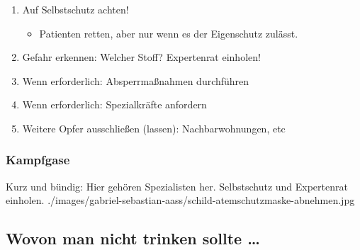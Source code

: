 {{\begin{enumerate}
  \item Auf Selbstschutz achten!
  \begin{itemize}
    \item Patienten retten, aber nur wenn es der
    Eigenschutz zulässt.
  \end{itemize}
  \item Gefahr erkennen: Welcher Stoff? Expertenrat einholen!
  \item Wenn erforderlich: Absperrmaßnahmen durchführen
  \item Wenn erforderlich:  Spezialkräfte anfordern
  \item Weitere Opfer ausschließen (lassen):
  Nachbarwohnungen, etc
\end{enumerate}
}




\subsubsection{Kampfgase}

{%
Kurz und bündig: Hier gehören Spezialisten her.
Selbstschutz und Expertenrat einholen.
}{
}{./images/gabriel-sebastian-aass/schild-atemschutzmaske-abnehmen.jpg}{}{}


\clearpage
\subsection{Wovon man nicht trinken sollte \ldots}

}
